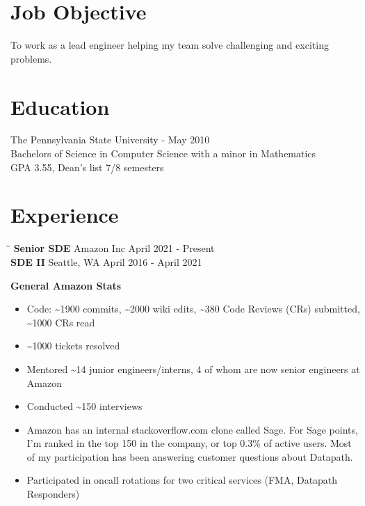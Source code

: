 \documentclass{res}
\begin{document}
 


\vspace{-24pt}
\address{bennet.huber@gmail.com\\(215) 490-4297}
\address{1219 NW Richmond Beach Rd\\Shoreline, WA 98177}

\begin{resume}

\section{Job Objective}
    To work as a lead engineer helping my team solve challenging and exciting problems.
 
\section{Education}
    The Pennsylvania State University - May 2010\\
    Bachelors of Science in Computer Science with a minor in Mathematics\\
    GPA 3.55, Dean's list 7/8 semesters
 
\section{Experience}
   \vspace{-0.1in}
   \begin{tabbing}%
   \hspace{2.2in}\= \hspace{2.2in}\= \kill %
   {\bf Senior SDE}  \> Amazon Inc\> April 2021 - Present\\
   {\bf SDE II}          \> Seattle, WA \> April 2016 - April 2021
   \end{tabbing}\vspace{-17pt}
   {\large \bf General Amazon Stats}
   \begin{itemize}
   \item Code: \textasciitilde 1900 commits, \textasciitilde 2000 wiki edits, \textasciitilde 380 Code Reviews (CRs) submitted, \textasciitilde 1000 CRs read
   \item \textasciitilde 1000 tickets resolved
   \item Mentored \textasciitilde 14 junior engineers/interns, 4 of whom are now senior engineers at Amazon
   \item Conducted \textasciitilde 150 interviews
   \item Amazon has an internal stackoverflow.com clone called Sage.  For Sage points, I'm ranked in the top 150 in the    company, or top 0.3\% of active users.  Most of my participation has been answering customer questions about Datapath.
   \item Participated in oncall rotations for two critical services (FMA, Datapath Responders)
   \end{itemize}
   

\end{resume}
\end{document}
